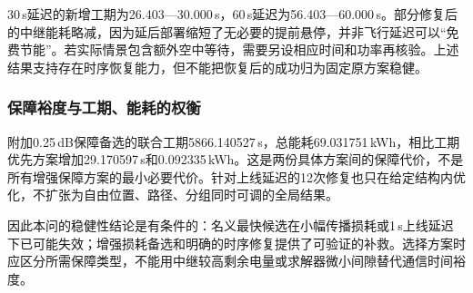 30\,s延迟的新增工期为26.403—30.000\,s，60\,s延迟为56.403—60.000\,s。部分修复后的中继能耗略减，因为延后部署缩短了无必要的提前悬停，并非飞行延迟可以“免费节能”。若实际情景包含额外空中等待，需要另设相应时间和功率再核验。上述结果支持存在时序恢复能力，但不能把恢复后的成功归为固定原方案稳健。

\subsubsection{保障裕度与工期、能耗的权衡}
附加0.25\,dB保障备选的联合工期5866.140527\,s，总能耗69.031751\,kWh，相比工期优先方案增加29.170597\,s和0.092335\,kWh。这是两份具体方案间的保障代价，不是所有增强保障方案的最小必要代价。针对上线延迟的12次修复也只在给定结构内优化，不扩张为自由位置、路径、分组同时可调的全局结果。

因此本问的稳健性结论是有条件的：名义最快候选在小幅传播损耗或1\,s上线延迟下已可能失效；增强损耗备选和明确的时序修复提供了可验证的补救。选择方案时应区分所需保障类型，不能用中继较高剩余电量或求解器微小间隙替代通信时间裕度。


